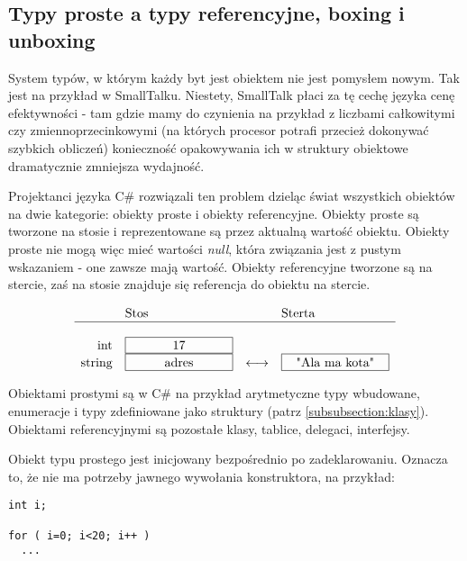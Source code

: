 \subsection{Typy proste a typy referencyjne, boxing i unboxing}

System typów, w którym każdy byt jest obiektem nie jest pomysłem nowym. Tak jest na przykład
w SmallTalku. Niestety, SmallTalk płaci za tę cechę języka cenę efektywności - tam gdzie mamy
do czynienia na przykład z liczbami całkowitymi czy zmiennoprzecinkowymi (na których procesor
potrafi przecież dokonywać szybkich obliczeń) konieczność opakowywania ich w struktury obiektowe
dramatycznie zmniejsza wydajność.

Projektanci języka C\# rozwiązali ten problem dzieląc świat wszystkich obiektów na dwie kategorie:
obiekty proste i obiekty referencyjne. Obiekty proste są tworzone na stosie i reprezentowane są
przez aktualną wartość obiektu. Obiekty proste nie mogą więc mieć wartości {\em null}, która
związania jest z pustym wskazaniem - one zawsze mają wartość. 
Obiekty referencyjne tworzone są na stercie, zaś na stosie znajduje
się referencja do obiektu na stercie. 

\begin{center}
$$
\begin{array}{rlll}
           & \mbox{Stos} & & \mbox{Sterta} \\
             \hline            \\
\mbox{int} & \framebox[3cm]{17} & & \\
\mbox{string} & \framebox[3cm]{adres} & \longleftrightarrow & \framebox[3cm]{"Ala ma kota"} \\

\end{array}
$$
\end{center}

Obiektami prostymi są w C\# na przykład arytmetyczne typy wbudowane, enumeracje i typy zdefiniowane
jako struktury (patrz \ref{subsubsection:klasy}). Obiektami referencyjnymi są pozostałe klasy, tablice,
delegaci, interfejsy.

Obiekt typu prostego jest inicjowany bezpośrednio po zadeklarowaniu. Oznacza to, że nie ma
potrzeby jawnego wywołania konstruktora, na przykład:

\begin{scriptsize}
\begin{verbatim}
int i;

for ( i=0; i<20; i++ )
  ...
\end{verbatim}
\end{scriptsize}

